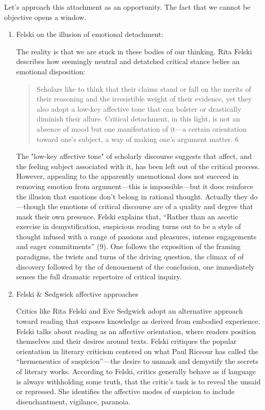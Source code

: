 \documentclass[11pt]{article}
\begin{document}
Let's approach this attachment as an opportunity. The fact that we
cannot be objective opens a window. 

\begin{enumerate}
\item Felski on the illusion of emotional detachment:
\label{sec:orgda33645}

The reality is that we are stuck in these bodies of our thinking. Rita
Felski describes how seemingly neutral and detatched critical stance
belies an emotional disposition:

\begin{quote}
Scholars like to think that their claims stand or fall on the merits
of their reasoning and the irresistible weight of their evidence, yet
they also adopt a low-key affective tone that can bolster or
drastically diminish their allure. Critical detachment, in this light,
is not an absence of mood but one manifestation of it---a certain
orientation toward one's subject, a way of making one's argument
matter. 6
\end{quote}

The "low-key affective tone" of scholarly discourse suggests that
affect, and the feeling subject associated with it, has been left out
of the critical process. However, appealing to the apparently
unemotional does not succeed in removing emotion from argument---this
is impossible---but it does reinforce the illusion that emotions don't
belong in rational thought. Actually they do---though the emotions of
critical discourse are of a quality and degree that mask their own
presence. Felski explains that, “Rather than an ascetic exercise in
demystification, suspicious reading turns out to be a style of thought
infused with a range of passions and pleasures, intense engagements
and eager commitments” (9). One follows the exposition of the framing
paradigms, the twists and turns of the driving question, the climax of
of discovery followed by the of denouement of the conclusion, one
immediately senses the full dramatic repertoire of critical
inquiry. 

\item Felski \& Sedgwick affective approaches
\label{sec:org4d411d5}

Critics like Rita Felski and Eve Sedgwick adopt an alternative
approach toward reading that exposes knowledge as derived from
embodied experience. Felski talks about reading as an affective
orientation, where readers position themselves and their desires
around texts. Felski critiques the popular orientation in literary
criticism centered on what Paul Riceour has called the “hermeneutics
of suspicion”---the desire to unmask and demystify the secrets of
literary works. According to Felski, critics generally behave as if
language is always withholding some truth, that the critic’s task is
to reveal the unsaid or repressed. She identifies the affective modes
of suspicion to include disenchantment, vigilance, paranoia. 


\end{enumerate}
\end{document}

